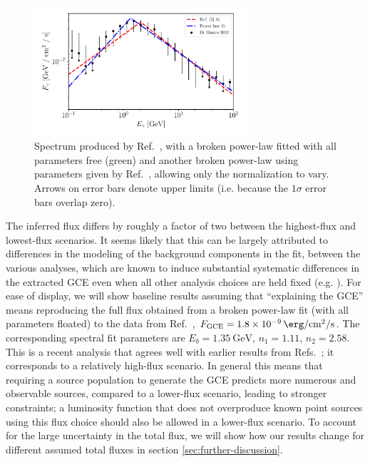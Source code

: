 \documentclass[letter,11pt]{article}
\begin{document}
\begin{figure}
    \centering
    \includegraphics[width=0.7\textwidth]{figs/di-mauro-example.pdf}
    \caption{Spectrum produced by Ref.~\cite{DiMauro:2021raz}, with a broken power-law fitted with all parameters free (green) and another broken power-law using parameters given by Ref.~\cite{Calore:2014xka}, allowing only the normalization to vary. Arrows on error bars denote upper limits (i.e. because the $1\sigma$ error bars overlap zero).}
    \label{fig:di-mauro-example}
\end{figure}

The inferred flux differs by roughly a factor of two between the highest-flux and lowest-flux scenarios. It seems likely that this can be largely attributed to differences in the modeling of the background components in the fit, between the various analyses, which are known to induce substantial systematic differences in the extracted GCE even when all other analysis choices are held fixed  (e.g. \cite{Calore:2014xka, Buschmann:2020adf, List:2020mzd}). For ease of display, we will show baseline results assuming that ``explaining the GCE'' means reproducing the full flux obtained from a broken power-law fit (with all parameters floated) to the data from Ref.~\cite{DiMauro:2021raz}, $F_\text{GCE} = \SI{1.8e-09}{\erg\per\centi\meter\squared\per\second}$. The corresponding spectral fit parameters are $E_b = \SI{1.35}{\giga\electronvolt}$, $n_1=1.11$, $n_2 = 2.58$. This is a recent analysis that agrees well with earlier results from Refs.~\cite{Calore:2014xka, Ajello:2017opo}; it corresponds to a relatively high-flux scenario. In general this means that requiring a source population to generate the GCE predicts more numerous and observable sources, compared to a lower-flux scenario, leading to stronger constraints; a luminosity function that does not overproduce known point sources using this flux choice should also be allowed in a lower-flux scenario. To account for the large uncertainty in the total flux, we will show how our results change for different assumed total fluxes in section \ref{sec:further-discussion}.
\end{document}
